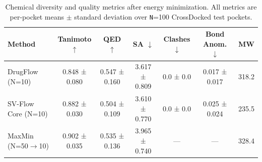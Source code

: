 \begin{table}[t]
\centering
\caption{Chemical diversity and quality metrics after energy minimization.
         All metrics are per-pocket means $\pm$ standard deviation over
         \texttt{N}=100 CrossDocked test pockets.}
\label{tab:main}
\begin{tabular}{lcccccc}
\toprule
\textbf{Method} & \textbf{Tanimoto $\uparrow$} & \textbf{QED $\uparrow$} &
\textbf{SA $\downarrow$} & \textbf{Clashes $\downarrow$} &
\textbf{Bond Anom. $\downarrow$} & \textbf{MW} \\
\midrule
DrugFlow (N=10)
    & 0.848 ± 0.080
    & 0.547 ± 0.160
    & 3.617 ± 0.809
    & 0.0 ± 0.0
    & 0.017 ± 0.017
    & 318.2 \\
SV-Flow Core (N=10)
    & 0.882 ± 0.030
    & 0.504 ± 0.109
    & 3.610 ± 0.770
    & 0.0 ± 0.0
    & 0.025 ± 0.024
    & 235.5 \\
MaxMin (N=50$\to$10)
    & 0.902 ± 0.035
    & 0.535 ± 0.136
    & 3.965 ± 0.740
    & — & — &
    328.4 \\
\bottomrule
\end{tabular}
\end{table}
